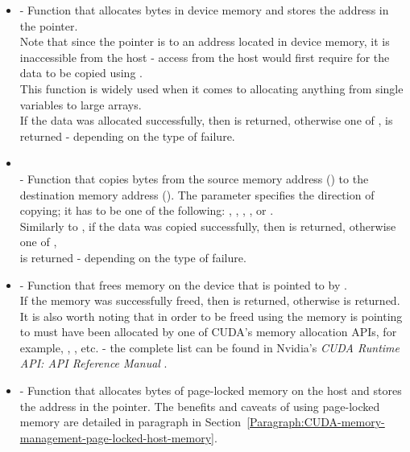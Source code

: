 \begin{itemize}
	\item {} - Function that allocates  bytes in device memory and stores the address in the  pointer. \\
	Note that since the pointer is to an address located in device memory, it is inaccessible from the host - access from the host would first require for the data to be copied using . \\
	This function is widely used when it comes to allocating anything from single variables to large arrays. \\
	If the data was allocated successfully, then  is returned, otherwise one of ,  is returned - depending on the type of failure.
	\item {}\\  - Function that copies  bytes from the source memory address () to the destination memory address (). The  parameter specifies the direction of copying; it has to be one of the following: , , , , or . \\
	Similarly to , if the data was copied successfully, then  is returned, otherwise one of , \\  is returned - depending on the type of failure.
	\item {} - Function that frees memory on the device that is pointed to by . \\
	If the memory was successfully freed, then  is returned, otherwise  is returned. \\
	It is also worth noting that in order to be freed using  the memory  is pointing to must have been allocated by one of CUDA's memory allocation APIs, for example, , , etc. - the complete list can be found in Nvidia's \emph{CUDA Runtime API: API Reference Manual} \cite{NvidiaJanuary2022}.
	\item {} - Function that allocates  bytes of page-locked memory on the host and stores the address in the  pointer. The benefits and caveats of using page-locked memory are detailed in paragraph \textit{} in Section~\ref{Paragraph:CUDA-memory-management-page-locked-host-memory}.
\end{itemize}

